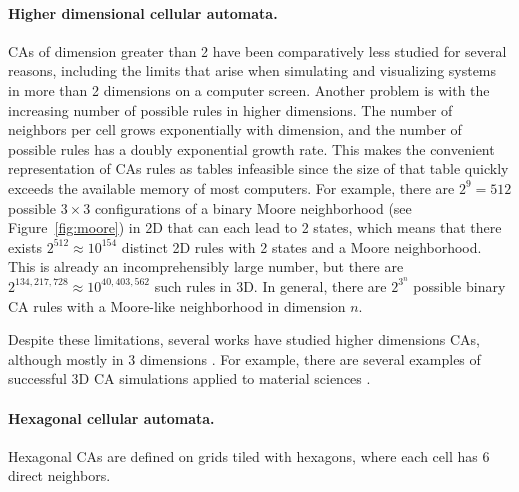 \paragraph{Higher dimensional cellular automata.}
\acp{CA} of dimension greater than 2 have been comparatively less studied for
several reasons, including the limits that arise when simulating and visualizing
systems in more than 2 dimensions on a computer screen. Another problem is with
the increasing number of possible rules in higher dimensions. The number of
neighbors per cell grows exponentially with dimension, and the number of
possible rules has a doubly exponential growth rate. This makes the
convenient representation of \acp{CA} rules as tables infeasible since the size
of that table quickly exceeds the available memory of most computers. For
example, there are $2^9 = 512$ possible $3\times 3$ configurations of a binary Moore neighborhood (see Figure~\ref{fig:moore}) in 2D that can each lead to 2 states, which means that there exists $2^{512} \approx 10^{154}$ distinct 2D rules with 2 states and a
Moore neighborhood. This is already an incomprehensibly large number, but there
are $2^{134,217,728} \approx 10^{40,403,562}$ such rules in 3D. In general, there are $2^{3^n}$ possible binary \ac{CA} rules with a Moore-like neighborhood in dimension $n$.

Despite these limitations, several works have studied higher dimensions \acp{CA},
although mostly in 3 dimensions
\parencite{tsalidesThreedimensionalCellularAutomata1989,
  sudhakaranGrowing3DArtefacts2021}. For example, there are several examples of
successful 3D \ac{CA} simulations applied to material sciences
\parencite{gandin3DCellularAutomaton1997, arataFreeformShapeModeling1999,
  panStudyFailureScale2009, dicaprio3DCellularAutomata2016}.

\paragraph{Hexagonal cellular automata.}
Hexagonal \acp{CA} are defined on grids tiled with hexagons, where each
cell has 6 direct neighbors.

